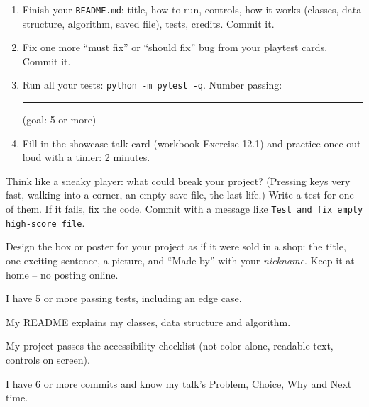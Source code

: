 \namedateline

\begin{core}
\begin{enumerate}[itemsep=1pt]
  \item Finish your \texttt{README.md}: title, how to run, controls, how it works (classes, data structure, algorithm, saved file), tests, credits. Commit it.
  \item Fix one more \enquote{must fix} or \enquote{should fix} bug from your playtest cards. Commit it.
  \item Run all your tests: \texttt{python -m pytest -q}. Number passing: \rule{1.5cm}{0.4pt} (goal: 5 or more)
  \item Fill in the showcase talk card (workbook Exercise 12.1) and practice once out loud with a timer: 2 minutes.
\end{enumerate}
\end{core}

\begin{challenge}
Think like a sneaky player: what could break your project? (Pressing keys very fast, walking into a corner, an empty save file, the last life.) Write a test for one of them. If it fails, fix the code. Commit with a message like \texttt{Test and fix empty high-score file}.
\end{challenge}

\begin{creative}
Design the box or poster for your project as if it were sold in a shop: the title, one exciting sentence, a picture, and \enquote{Made by} with your \emph{nickname}. Keep it at home -- no posting online.
\answerspace{4cm}
\end{creative}

\begin{selfcheck}
  \item I have 5 or more passing tests, including an edge case.
  \item My README explains my classes, data structure and algorithm.
  \item My project passes the accessibility checklist (not color alone, readable text, controls on screen).
  \item I have 6 or more commits and know my talk's Problem, Choice, Why and Next time.
\end{selfcheck}
